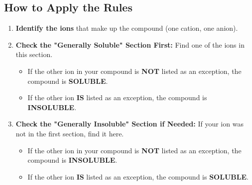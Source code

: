 \documentclass{article}
\begin{document}
\subsection*{How to Apply the Rules}
\begin{enumerate}[itemsep=5pt]
    \item \textbf{Identify the ions} that make up the compound (one cation, one anion).
    \item \textbf{Check the "Generally Soluble" Section First:} Find one of the ions in this section.
    \begin{itemize}
        \item If the other ion in your compound is \textbf{NOT} listed as an exception, the compound is \textbf{SOLUBLE}.
        \item If the other ion \textbf{IS} listed as an exception, the compound is \textbf{INSOLUBLE}.
    \end{itemize}
    \item \textbf{Check the "Generally Insoluble" Section if Needed:} If your ion was not in the first section, find it here.
    \begin{itemize}
        \item If the other ion in your compound is \textbf{NOT} listed as an exception, the compound is \textbf{INSOLUBLE}.
        \item If the other ion \textbf{IS} listed as an exception, the compound is \textbf{SOLUBLE}.
    \end{itemize}
\end{enumerate}
\end{document}
